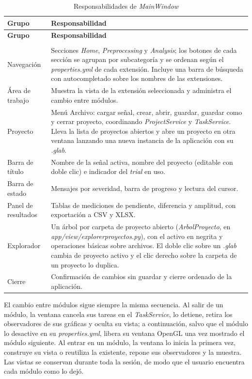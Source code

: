 \documentclass[12pt,letterpaper,oneside]{article}
\DeclareRobustCommand{\_}{\textunderscore\allowbreak}
\begin{document}
\begin{center}
\small
\begin{longtable}{|p{}|p{}|}
\hline
\textbf{Grupo} & \textbf{Responsabilidad} \\
\hline
\endfirsthead
\hline
\textbf{Grupo} & \textbf{Responsabilidad} \\
\hline
\endhead
\hline
\endfoot
\hline
\caption{Responsabilidades de \textit{MainWindow}} \label{tab:sdd_mainwindow} \\
\endlastfoot
Navegación & Secciones \textit{Home}, \textit{Preprocessing} y \textit{Analysis}; los botones de cada sección se agrupan por subcategoría y se ordenan según el \textit{properties.yml} de cada extensión. Incluye una barra de búsqueda con autocompletado sobre los nombres de las extensiones. \\
\hline
Área de trabajo & Muestra la vista de la extensión seleccionada y administra el cambio entre módulos. \\
\hline
Proyecto & Menú Archivo: cargar señal, crear, abrir, guardar, guardar como y cerrar proyecto, coordinando \textit{ProjectService} y \textit{TaskService}. Lleva la lista de proyectos abiertos y abre un proyecto en otra ventana lanzando una nueva instancia de la aplicación con su \textit{.glab}. \\
\hline
Barra de título & Nombre de la señal activa, nombre del proyecto (editable con doble clic) e indicador del \textit{trial} en uso. \\
\hline
Barra de estado & Mensajes por severidad, barra de progreso y lectura del cursor. \\
\hline
Panel de resultados & Tablas de mediciones de pendiente, diferencia y amplitud, con exportación a CSV y XLSX. \\
\hline
Explorador & Un árbol por carpeta de proyecto abierto (\textit{ArbolProyecto}, en \textit{app/view/explorer\_proyectos.py}), con el activo en negrita y operaciones básicas sobre archivos. El doble clic sobre un \textit{.glab} cambia de proyecto activo y el clic derecho sobre la carpeta de un proyecto lo duplica. \\
\hline
Cierre & Confirmación de cambios sin guardar y cierre ordenado de la aplicación. \\
\hline
\end{longtable}
\end{center}

El cambio entre módulos sigue siempre la misma secuencia. Al salir de un módulo, la ventana cancela sus tareas en el \textit{TaskService}, lo detiene, retira los observadores de sus gráficas y oculta su vista; a continuación, salvo que el módulo lo desactive en su \textit{properties.yml}, libera su ventana OpenGL una vez mostrado el módulo siguiente. Al entrar en un módulo, la ventana lo inicia la primera vez, construye su vista o reutiliza la existente, repone sus observadores y la muestra. Las vistas se conservan durante toda la sesión, de modo que el usuario encuentra cada módulo como lo dejó.
\end{document}
